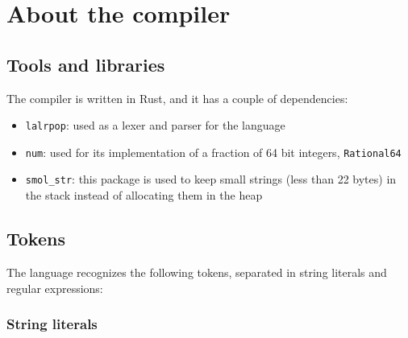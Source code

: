 \documentclass[11pt]{scrreprt}
\begin{document}
\chapter{About the compiler}

\section{Tools and libraries}
The compiler is written in Rust, and it has a couple of dependencies:
\begin{itemize}
  \item \texttt{lalrpop}: used as a lexer and parser for the language
  \item \texttt{num}: used for its implementation of a fraction of 64 bit integers, \texttt{Rational64}
  \item \texttt{smol\_str}: this package is used to keep small strings (less than 22 bytes) in the stack instead of allocating them in the heap
\end{itemize}

\section{Tokens}
The language recognizes the following tokens, separated in string literals and regular expressions:

\subsection{String literals}
\end{document}
